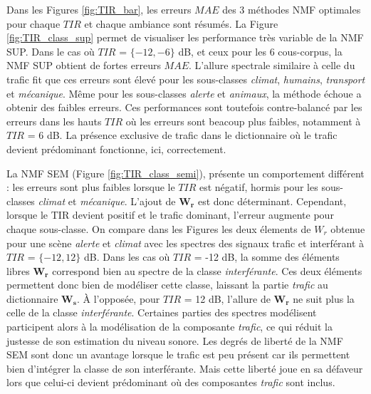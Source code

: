 Dans les Figures \ref{fig:TIR_bar}, les erreurs $MAE$ des 3 méthodes NMF optimales pour chaque $TIR$ et chaque ambiance sont résumés. La Figure \ref{fig:TIR_class_sup} permet de visualiser les performance très variable de la NMF SUP. Dans le cas où $TIR$ = $\lbrace -12, -6 \rbrace$ dB, et ceux pour les 6 cous-corpus, la NMF SUP obtient de fortes erreurs $MAE$. L'allure spectrale similaire à celle du trafic fit que ces erreurs sont élevé pour les sous-classes \textit{climat}, \textit{humains}, \textit{transport} et \textit{mécanique}. Même pour les sous-classes \textit{alerte} et \textit{animaux}, la méthode échoue a obtenir des faibles erreurs. Ces performances sont toutefois contre-balancé par les erreurs dans les hauts $TIR$ où les erreurs sont beacoup plus faibles, notamment à $TIR$ = 6 dB. La présence exclusive de trafic dans le dictionnaire où le trafic devient prédominant fonctionne, ici, correctement.

La NMF SEM (Figure \ref{fig:TIR_class_semi}), présente un comportement différent : les erreurs sont plus faibles lorsque le $TIR$ est négatif, hormis pour les sous-classes \textit{climat}  et \textit{mécanique}. L'ajout de $\mathbf{W_r}$ est donc déterminant. Cependant, lorsque le TIR devient positif et le trafic dominant, l'erreur augmente pour chaque sous-classe.
On compare dans les Figures \label{fig:Y_ambiance} les deux élements de $W_r$ obtenue pour une scène \textit{alerte} et \textit{climat} avec les spectres des signaux trafic et interférant à $TIR$ = $\lbrace -12, 12 \rbrace$ dB. Dans les cas où $TIR$ = -12 dB, la somme des éléments libres $\mathbf{W_r}$ correspond bien au spectre de la classe \textit{interférante}. Ces deux éléments permettent donc bien de modéliser cette classe, laissant la partie \textit{trafic} au dictionnaire $\mathbf{W_s}$. À l'opposée, pour $TIR$ = 12 dB, l'allure de $\mathbf{W_r}$ ne suit plus la celle de la classe \textit{interférante}. Certaines parties des spectres modélisent participent alors à la modélisation de la composante \textit{trafic}, ce qui réduit la justesse de son estimation du niveau sonore. Les degrés de liberté de la NMF SEM sont donc un avantage lorsque le trafic est peu présent car ils permettent bien d'intégrer la classe de son interférante. Mais cette liberté joue en sa défaveur lors que celui-ci devient prédominant où des composantes \textit{trafic} sont inclus.\\


